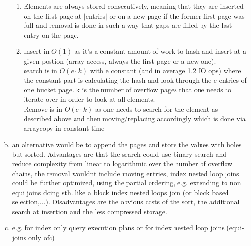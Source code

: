 \documentclass[a4paper]{article}
\begin{document}
\begin{enumerate}[a.]
\begin{enumerate}
                \item
                    Elements are always stored consecutively, meaning that they are inserted on the first page at $|$entries$|$ or on a new page if the former first page was full
                    and removal is done in such a way that gaps are filled by the last entry on the page.
                \item Insert in $O(1)$ as it's a constant amount of work to hash and insert at a given postion (array access, always the first page or a new one). \\
                    search is in $O(e \cdot k)$ with e constant (and in average 1.2 IO ops) where the constant part is calculating the hash and look through the e entries of one bucket page.
                    k is the number of overflow pages that one needs to iterate over in order to look at all elements. \\
                    Remove is in $O(e \cdot k)$ as one needs to search for the element as described above and then moving/replacing accordingly which is done via arraycopy in constant time

            \end{enumerate}
        \item an alternative would be to append the pages and store the values with holes but sorted. Advantages are that the search could use binary search and reduce complexity from
            linear to logarithmic over the number of overflow chains, the removal wouldnt include moving entries, index nested loop joins could be further optimized, using the partial ordering, 
            e.g. extending to non equi joins doing sth. like a block index nested loops join (or block based selection,...).
            Disadvantages are the obvious costs of the sort, the additional search at insertion and the less compressed storage.
        \item e.g. for index only query execution plans or for index nested loop joins (equi-joins only ofc)
   \end{enumerate}
\end{document}
